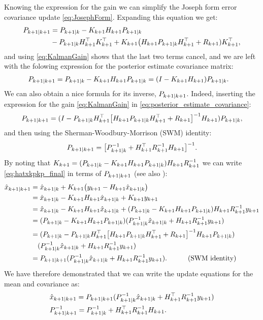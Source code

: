 Knowing the expression for the gain we can simplify the Joseph form error covariance update
\eqref{eq:JosephForm}. Expanding this equation we get:
\begin{align*}
P_{k+1|k+1} & = P_{k+1|k} - K_{k+1} H_{k+1}P_{k+1|k}\\
& - P_{k+1|k} H_{k+1}^\top K_{k+1}^\top + 
 K_{k+1}\big( H_{k+1}P_{k+1|k} H_{k+1}^\top + R_{k+1})K_{k+1}^\top,
\end{align*}
and using \eqref{eq:KalmanGain} shows that the last two terms cancel, and we are left
with the folowing expression for the posterior estimate covariance matrix:
\begin{align}\label{eq:posterior_estimate_covariance}
P_{k+1|k+1} & = P_{k+1|k} - K_{k+1} H_{k+1}P_{k+1|k} = (I - K_{k+1} H_{k+1})P_{k+1|k}.
\end{align}
We can also obtain a nice formula for its inverse, $P_{k+1|k+1}$. Indeed, inserting the expression
for the gain \eqref{eq:KalmanGain} in \eqref{eq:posterior_estimate_covariance}:
\[
P_{k+1|k+1} =  (I - P_{k+1|k} H_{k+1}^\top\big[H_{k+1}P_{k+1|k} H_{k+1}^\top + 
R_{k+1}\big]^{-1} H_{k+1})P_{k+1|k},
\]
and then using the Sherman-Woodbury-Morrison (SWM) identity:
\[
P_{k+1|k+1} = \big[P_{k+1|k}^{-1} + H_{k+1}^\top R_{k+1}^{-1} H_{k+1}\big]^{-1}.
\]
By noting that $K_{k+1} = (P_{k+1|k} - K_{k+1} H_{k+1} P_{k+1|k}) H_{k+1} R_{k+1}^{-1}$ we can write 
\eqref{eq:hatxkpkp_final} in terms of $P_{k+1|k+1}$ (see also \cite{evensen2003ensemble,nino2015efficient}):
\begin{align*}
\hat{x}_{k+1|k+1}
& = \hat{x}_{k+1|k} + K_{k+1} \big(y_{k+1} - H_{k+1} \hat{x}_{k+1|k} \big)\\
& = \hat{x}_{k+1|k} - K_{k+1} H_{k+1} \hat{x}_{k+1|k} + K_{k+1} y_{k+1}\\
& = \hat{x}_{k+1|k} - K_{k+1} H_{k+1} \hat{x}_{k+1|k} + (P_{k+1|k} - K_{k+1} H_{k+1} P_{k+1|k}) H_{k+1} R_{k+1}^{-1}y_{k+1}\\
& = (P_{k+1|k} - K_{k+1} H_{k+1}P_{k+1|k})(P_{k+1|k}^{-1}\hat{x}_{k+1|k} + H_{k+1} R_{k+1}^{-1}y_{k+1})\\
& = (P_{k+1|k} - P_{k+1|k} H_{k+1}^\top\big[H_{k+1}P_{k+1|k} H_{k+1}^\top + R_{k+1}\big]^{-1} H_{k+1}P_{k+1|k})\\
& \quad (P_{k+1|k}^{-1}\hat{x}_{k+1|k} + H_{k+1} R_{k+1}^{-1}y_{k+1})\\
& = P_{k+1|k+1}(P_{k+1|k}^{-1}\hat{x}_{k+1|k} + H_{k+1} R_{k+1}^{-1}y_{k+1}).\qquad\quad \text{(SWM identity)}
\end{align*}
We have therefore demonstrated that we can write the update equations for the mean and covariance as:
\begin{align}
& \hat{x}_{k+1|k+1} = P_{k+1|k+1}(P_{k+1|k}^{-1}\hat{x}_{k+1|k} + H_{k+1}^\top R_{k+1}^{-1}y_{k+1})\\
& P_{k+1|k+1}^{-1} = P_{k+1|k}^{-1} + H_{k+1}^\top R_{k+1}^{-1} H_{k+1} \label{eq:ForecastPosteriorSigma}.
\end{align}


